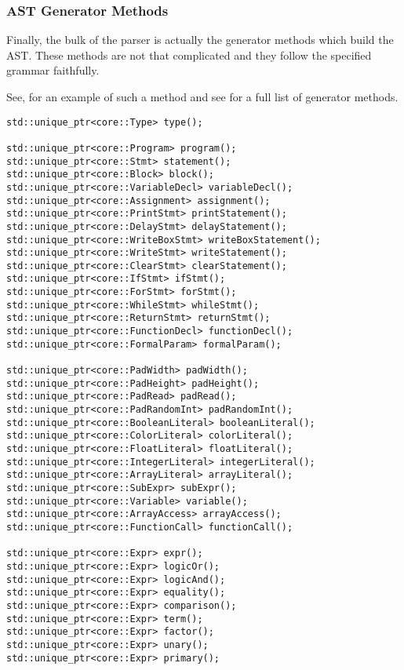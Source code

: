 \subsubsection{AST Generator Methods}

Finally, the bulk of the parser is actually the generator
methods which build the AST. These methods are not that
complicated and they follow the specified grammar faithfully.

See,  for an example of such a method and see
 for a full list of generator methods.



\begin{lstlisting}[caption={The main body of methods in the
\texttt{Parser} class (parser/Parser.hpp).},
label=lst:methodslist]
std::unique_ptr<core::Type> type();

std::unique_ptr<core::Program> program();
std::unique_ptr<core::Stmt> statement();
std::unique_ptr<core::Block> block();
std::unique_ptr<core::VariableDecl> variableDecl();
std::unique_ptr<core::Assignment> assignment();
std::unique_ptr<core::PrintStmt> printStatement();
std::unique_ptr<core::DelayStmt> delayStatement();
std::unique_ptr<core::WriteBoxStmt> writeBoxStatement();
std::unique_ptr<core::WriteStmt> writeStatement();
std::unique_ptr<core::ClearStmt> clearStatement();
std::unique_ptr<core::IfStmt> ifStmt();
std::unique_ptr<core::ForStmt> forStmt();
std::unique_ptr<core::WhileStmt> whileStmt();
std::unique_ptr<core::ReturnStmt> returnStmt();
std::unique_ptr<core::FunctionDecl> functionDecl();
std::unique_ptr<core::FormalParam> formalParam();

std::unique_ptr<core::PadWidth> padWidth();
std::unique_ptr<core::PadHeight> padHeight();
std::unique_ptr<core::PadRead> padRead();
std::unique_ptr<core::PadRandomInt> padRandomInt();
std::unique_ptr<core::BooleanLiteral> booleanLiteral();
std::unique_ptr<core::ColorLiteral> colorLiteral();
std::unique_ptr<core::FloatLiteral> floatLiteral();
std::unique_ptr<core::IntegerLiteral> integerLiteral();
std::unique_ptr<core::ArrayLiteral> arrayLiteral();
std::unique_ptr<core::SubExpr> subExpr();
std::unique_ptr<core::Variable> variable();
std::unique_ptr<core::ArrayAccess> arrayAccess();
std::unique_ptr<core::FunctionCall> functionCall();

std::unique_ptr<core::Expr> expr();
std::unique_ptr<core::Expr> logicOr();
std::unique_ptr<core::Expr> logicAnd();
std::unique_ptr<core::Expr> equality();
std::unique_ptr<core::Expr> comparison();
std::unique_ptr<core::Expr> term();
std::unique_ptr<core::Expr> factor();
std::unique_ptr<core::Expr> unary();
std::unique_ptr<core::Expr> primary();
\end{lstlisting}

